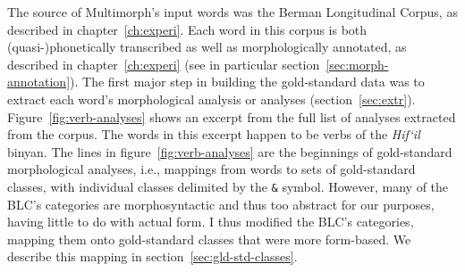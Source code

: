 The source of Multimorph's input words was the 
Berman Longitudinal Corpus, as described in chapter~\ref{ch:experi}. Each word in this corpus is both (quasi-)phonetically 
transcribed as well as morphologically annotated, as described in chapter~\ref{ch:experi} 
(see in particular section~\ref{sec:morph-annotation}).
The first major step in 
building the gold-standard data was to extract each word's morphological analysis 
or analyses (section~\ref{sec:extr}). Figure~\ref{fig:verb-analyses} shows an excerpt from the full list
of analyses extracted from the corpus. The words in this excerpt happen to be verbs of the \textit{Hif`il}
binyan. The lines in figure~\ref{fig:verb-analyses} are the 
beginnings of gold-standard morphological analyses, i.e., 
mappings from words to sets of gold-standard classes, with individual classes delimited by the 
\texttt{\&} symbol.  However, many of the BLC's categories are morphosyntactic and thus too abstract for our purposes, having little 
to do with actual form. I thus modified the BLC's categories, mapping them onto gold-standard classes that were
more form-based. We describe this mapping in section~\ref{sec:gld-std-classes}. 

